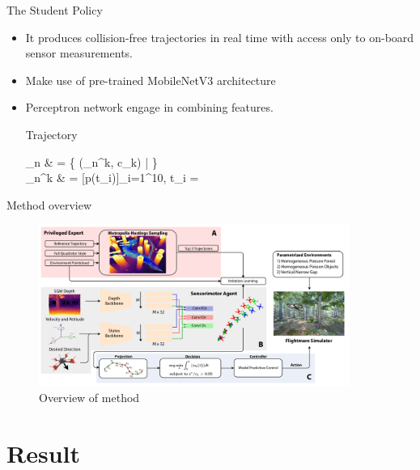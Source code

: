 \documentclass{beamer}
\begin{document}
\begin{frame}{The Student Policy}
	\begin{itemize}
		\item It produces collision-free trajectories in real time with access only to on-board sensor measurements.
		\item Make use of pre-trained MobileNetV3 architecture \autocite{MobileNet}
		\item Perceptron network engage in combining features.
		\begin{block}{Trajectory}
			\begin{flalign}
				_n & = \{ (\tau_n^k, c_k) | \in [0, 1, ..., M-1 ]\} \\
				\tau_n^k & = [p(t_i)]_{i=1}^{10}, t_i = 
			\end{flalign}
		\end{block}
		
	\end{itemize}
	
\end{frame}

\begin{frame}{Method overview}
	\begin{figure}
		\includegraphics[width=4in]{images/method-overview.png}
		\caption{Overview of method}
	\end{figure}
\end{frame}

\section{Result}
\end{document}
